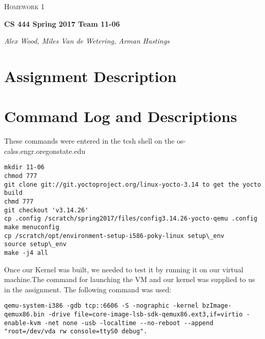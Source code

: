 \documentclass[letterpaper,10pt,draftclsnofoot,onecolumn]{IEEEtran}
\def\name{Alex Wood, Miles Van de Wetering, Arman Hastings}
\begin{document}
\begin{titlepage}
   \centering
	{\scshape\Large Homework 1\par}
	\vspace{1.5cm}
	{\huge\bfseries CS 444 Spring 2017 Team 11-06\par}
	\vspace{2cm}
	{\Large\itshape \name \par}
    
    \date{\today}
    
    \vspace{2cm}
    
    \begin{abstract}
 	This is the first group assignment of CS 344. We have started the project, but need to complete before abstract can be finished. 
   \end{abstract}
      
\end{titlepage}

\tableofcontents

\section{Assignment Description}

\section{Command Log and Descriptions}
These commands were entered in the tcsh shell on the os-calss.engr.oregonstate.edu

\begin{lstlisting}
mkdir 11-06
chmod 777
git clone git://git.yoctoproject.org/linux-yocto-3.14 to get the yocto build
chmd 777
git checkout 'v3.14.26'
cp .config /scratch/spring2017/files/config3.14.26-yocto-qemu .config
make menuconfig
cp /scratch/opt/environment-setup-i586-poky-linux setup\_env
source setup\_env
make -j4 all
\end{lstlisting}
Once our Kernel was built, we needed to test it by running it on our virtual machine.The command for launching the VM and our kernel was supplied to us in the assignment. The following command was used:  
\begin{lstlisting}
qemu-system-i386 -gdb tcp::6606 -S -nographic -kernel bzImage-qemux86.bin -drive file=core-image-lsb-sdk-qemux86.ext3,if=virtio -enable-kvm -net none -usb -localtime --no-reboot --append "root=/dev/vda rw console=ttyS0 debug".

\end{lstlisting}
\end{document}
